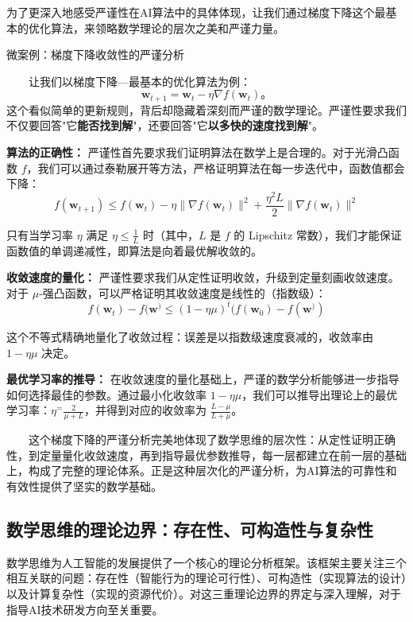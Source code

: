 为了更深入地感受严谨性在AI算法中的具体体现，让我们通过梯度下降这个最基本的优化算法，来领略数学理论的层次之美和严谨力量。

\begin{microcase}{微案例：梯度下降收敛性的严谨分析}

　　让我们以梯度下降---最基本的优化算法为例：
$$\mathbf{w}_{t+1} = \mathbf{w}_t - \eta \nabla f(\mathbf{w}_t)。$$
这个看似简单的更新规则，背后却隐藏着深刻而严谨的数学理论。严谨性要求我们不仅要回答"它\textbf{能否找到解}"，还要回答"它\textbf{以多快的速度找到解}"。


\textbf{算法的正确性：} 严谨性首先要求我们证明算法在数学上是合理的。对于光滑凸函数 $f$，我们可以通过泰勒展开等方法，严格证明算法在每一步迭代中，函数值都会下降：
$$f(\mathbf{w}_{t+1}) \leq f(\mathbf{w}_t) - \eta \|\nabla f(\mathbf{w}_t)\|^2 + \frac{\eta^2 L}{2} \|\nabla f(\mathbf{w}_t)\|^2$$

只有当学习率 $\eta$ 满足 $\eta \leq \frac{1}{L}$ 时（其中，$L$ 是 $f$ 的 Lipschitz 常数），我们才能保证函数值的单调递减性，即算法是向着最优解收敛的。

\textbf{收敛速度的量化：} 严谨性要求我们从定性证明收敛，升级到定量刻画收敛速度。对于 $\mu$-强凸函数，可以严格证明其收敛速度是线性的（指数级）：
$$f(\mathbf{w}_t) - f(\mathbf{w}^) \leq \left(1 - \eta\mu\right)^t (f(\mathbf{w}_0) - f(\mathbf{w}^))$$

这个不等式精确地量化了收敛过程：误差是以指数级速度衰减的，收敛率由 $1-\eta\mu$ 决定。

\textbf{最优学习率的推导：} 在收敛速度的量化基础上，严谨的数学分析能够进一步指导如何选择最佳的参数。通过最小化收敛率 $1-\eta\mu$，我们可以推导出理论上的最优学习率：$\eta^ = \frac{2}{\mu + L}$，并得到对应的收敛率为 $\frac{L-\mu}{L+\mu}$。

　　这个梯度下降的严谨分析完美地体现了数学思维的层次性：从定性证明正确性，到定量量化收敛速度，再到指导最优参数推导，每一层都建立在前一层的基础上，构成了完整的理论体系。正是这种层次化的严谨分析，为AI算法的可靠性和有效性提供了坚实的数学基础。
\end{microcase}

\subsection{数学思维的理论边界：存在性、可构造性与复杂性}

数学思维为人工智能的发展提供了一个核心的理论分析框架。该框架主要关注三个相互关联的问题：存在性（智能行为的理论可行性）、可构造性（实现算法的设计）以及计算复杂性（实现的资源代价）。对这三重理论边界的界定与深入理解，对于指导AI技术研发方向至关重要。

